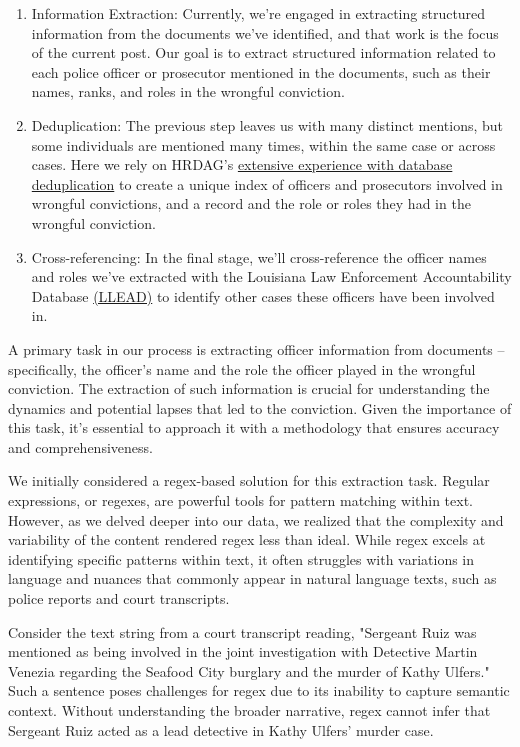 \documentclass{article}
\begin{document}
\begin{enumerate}
    \item Information Extraction: Currently, we're engaged in extracting structured information from the documents we've identified, and that work is the focus of the current post. Our goal is to extract structured information related to each police officer or prosecutor mentioned in the documents, such as their names, ranks, and roles in the wrongful conviction.

    \item Deduplication: The previous step leaves us with many distinct mentions, but some individuals are mentioned many times, within the same case or across cases. Here we rely on HRDAG's \href{https://hrdag.org/tech-notes/adaptive-blocking-writeup-1.html}{extensive experience with database deduplication} to create a unique index of officers and prosecutors involved in wrongful convictions, and a record and the role or roles they had in the wrongful conviction.

    \item Cross-referencing: In the final stage, we'll cross-reference the officer names and roles we've extracted with the Louisiana Law Enforcement Accountability Database \href{https://llead.co/}{(LLEAD)} to identify other cases these officers have been involved in.
\end{enumerate}

A primary task in our process is extracting officer information from documents – specifically, the officer's name and the role the officer played in the wrongful conviction. The extraction of such information is crucial for understanding the dynamics and potential lapses that led to the conviction. Given the importance of this task, it's essential to approach it with a methodology that ensures accuracy and comprehensiveness.

We initially considered a regex-based solution for this extraction task. Regular expressions, or regexes, are powerful tools for pattern matching within text. However, as we delved deeper into our data, we realized that the complexity and variability of the content rendered regex less than ideal. While regex excels at identifying specific patterns within text, it often struggles with variations in language and nuances that commonly appear in natural language texts, such as police reports and court transcripts.

Consider the text string from a court transcript reading, "Sergeant Ruiz was mentioned as being involved in the joint investigation with Detective Martin Venezia regarding the Seafood City burglary and the murder of Kathy Ulfers." Such a sentence poses challenges for regex due to its inability to capture semantic context. Without understanding the broader narrative, regex cannot infer that Sergeant Ruiz acted as a lead detective in Kathy Ulfers' murder case.
\end{document}
